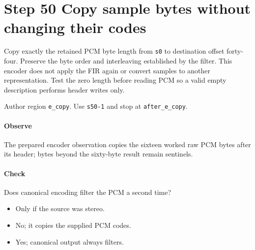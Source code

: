 \section{Step 50 Copy sample bytes without changing their codes}\label{pcm-wav-s50}
Copy exactly the retained PCM byte length from \texttt{s0} to destination offset forty-four. Preserve the byte order and interleaving established by the filter. This encoder does not apply the FIR again or convert samples to another representation. Test the zero length before reading PCM so a valid empty description performs header writes only.

Author region \texttt{e\_copy}. Use \texttt{s50-1} and stop at \texttt{after\_e\_copy}.

\paragraph{Observe} The prepared encoder observation copies the sixteen worked raw PCM bytes after its header; bytes beyond the sixty-byte result remain sentinels.

\paragraph{Check} Does canonical encoding filter the PCM a second time?
\begin{itemize}
  \item[A.] Only if the source was stereo.
  \item[B.] No; it copies the supplied PCM codes.
  \item[C.] Yes; canonical output always filters.
\end{itemize}
